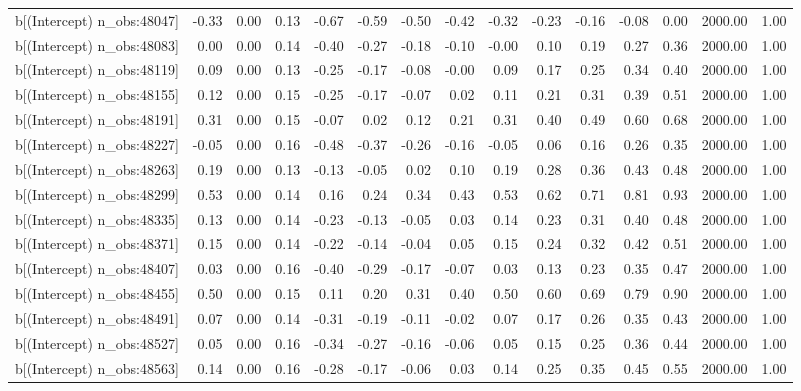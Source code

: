 \begin{table}[ht]
\begin{tabular}{rrrrrrrrrrrrrrr}
  b[(Intercept) n\_obs:48047] & -0.33 & 0.00 & 0.13 & -0.67 & -0.59 & -0.50 & -0.42 & -0.32 & -0.23 & -0.16 & -0.08 & 0.00 & 2000.00 & 1.00 \\ 
  b[(Intercept) n\_obs:48083] & 0.00 & 0.00 & 0.14 & -0.40 & -0.27 & -0.18 & -0.10 & -0.00 & 0.10 & 0.19 & 0.27 & 0.36 & 2000.00 & 1.00 \\ 
  b[(Intercept) n\_obs:48119] & 0.09 & 0.00 & 0.13 & -0.25 & -0.17 & -0.08 & -0.00 & 0.09 & 0.17 & 0.25 & 0.34 & 0.40 & 2000.00 & 1.00 \\ 
  b[(Intercept) n\_obs:48155] & 0.12 & 0.00 & 0.15 & -0.25 & -0.17 & -0.07 & 0.02 & 0.11 & 0.21 & 0.31 & 0.39 & 0.51 & 2000.00 & 1.00 \\ 
  b[(Intercept) n\_obs:48191] & 0.31 & 0.00 & 0.15 & -0.07 & 0.02 & 0.12 & 0.21 & 0.31 & 0.40 & 0.49 & 0.60 & 0.68 & 2000.00 & 1.00 \\ 
  b[(Intercept) n\_obs:48227] & -0.05 & 0.00 & 0.16 & -0.48 & -0.37 & -0.26 & -0.16 & -0.05 & 0.06 & 0.16 & 0.26 & 0.35 & 2000.00 & 1.00 \\ 
  b[(Intercept) n\_obs:48263] & 0.19 & 0.00 & 0.13 & -0.13 & -0.05 & 0.02 & 0.10 & 0.19 & 0.28 & 0.36 & 0.43 & 0.48 & 2000.00 & 1.00 \\ 
  b[(Intercept) n\_obs:48299] & 0.53 & 0.00 & 0.14 & 0.16 & 0.24 & 0.34 & 0.43 & 0.53 & 0.62 & 0.71 & 0.81 & 0.93 & 2000.00 & 1.00 \\ 
  b[(Intercept) n\_obs:48335] & 0.13 & 0.00 & 0.14 & -0.23 & -0.13 & -0.05 & 0.03 & 0.14 & 0.23 & 0.31 & 0.40 & 0.48 & 2000.00 & 1.00 \\ 
  b[(Intercept) n\_obs:48371] & 0.15 & 0.00 & 0.14 & -0.22 & -0.14 & -0.04 & 0.05 & 0.15 & 0.24 & 0.32 & 0.42 & 0.51 & 2000.00 & 1.00 \\ 
  b[(Intercept) n\_obs:48407] & 0.03 & 0.00 & 0.16 & -0.40 & -0.29 & -0.17 & -0.07 & 0.03 & 0.13 & 0.23 & 0.35 & 0.47 & 2000.00 & 1.00 \\ 
  b[(Intercept) n\_obs:48455] & 0.50 & 0.00 & 0.15 & 0.11 & 0.20 & 0.31 & 0.40 & 0.50 & 0.60 & 0.69 & 0.79 & 0.90 & 2000.00 & 1.00 \\ 
  b[(Intercept) n\_obs:48491] & 0.07 & 0.00 & 0.14 & -0.31 & -0.19 & -0.11 & -0.02 & 0.07 & 0.17 & 0.26 & 0.35 & 0.43 & 2000.00 & 1.00 \\ 
  b[(Intercept) n\_obs:48527] & 0.05 & 0.00 & 0.16 & -0.34 & -0.27 & -0.16 & -0.06 & 0.05 & 0.15 & 0.25 & 0.36 & 0.44 & 2000.00 & 1.00 \\ 
  b[(Intercept) n\_obs:48563] & 0.14 & 0.00 & 0.16 & -0.28 & -0.17 & -0.06 & 0.03 & 0.14 & 0.25 & 0.35 & 0.45 & 0.55 & 2000.00 & 1.00 \\ 

\end{tabular}
\end{table}

